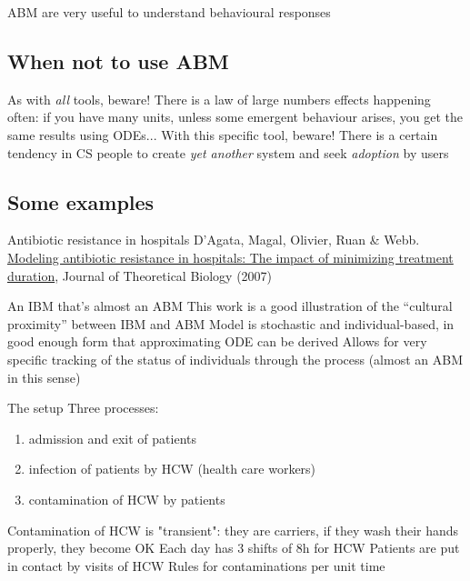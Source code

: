 \documentclass[aspectratio=43]{beamer}
\begin{document}
\begin{frame}{ABM are very useful to understand behavioural responses}
\end{frame} 

\subsection{When not to use ABM}

\begin{frame}{As with \emph{all} tools, beware!}
There is a law of large numbers effects happening often: if you have many units, unless some emergent behaviour arises, you get the same results using ODEs...
\vfill
With this specific tool, beware!
\vfill
There is a certain tendency in CS people to create \emph{yet another} system and seek \emph{adoption} by users
\end{frame}


\subsection{Some examples}

\begin{frame}{Antibiotic resistance in hospitals}
D’Agata, Magal, Olivier, Ruan \& Webb. \href{https://doi.org/10.1016/j.jtbi.2007.08.011}{Modeling antibiotic resistance in hospitals: The impact of minimizing treatment duration}, Journal of Theoretical Biology (2007)
\end{frame} 


\begin{frame}{An IBM that's almost an ABM}
This work is a good illustration of the ``cultural proximity'' between IBM and ABM
\vfill
Model is stochastic and individual-based, in good enough form that approximating ODE can be derived
\vfill
Allows for very specific tracking of the status of individuals through the process (almost an ABM in this sense)
\end{frame} 


\begin{frame}{The setup}
Three processes:
\begin{enumerate}
\item admission and exit of patients
\item infection of patients by HCW (health care workers) 
\item contamination of HCW by patients
\end{enumerate}

\vfill
Contamination of HCW is "transient": they are carriers, if they wash their hands properly, they become OK
\vfill
Each day has 3 shifts of 8h for HCW
\vfill
Patients are put in contact by visits of HCW
\vfill
Rules for contaminations per unit time
\end{frame} 
\end{document}

